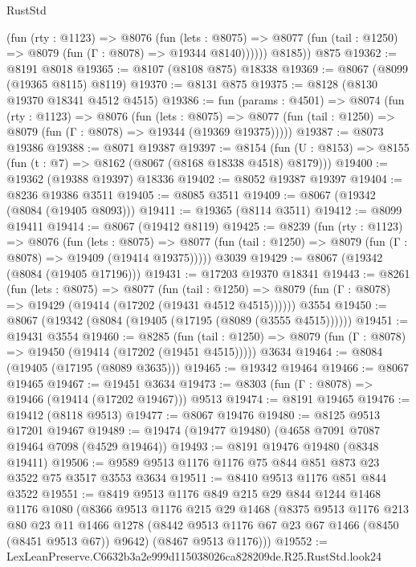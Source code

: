 \begin{lexlean}{RustStd}
\begin{coremodule}
            (fun (rty : @1123) =>
            @8076
              (fun (lets : @8075) =>
              @8077 (fun (tail : @1250) => @8079 (fun (Γ : @8078) => @19344 @8140))))))
        @8185))
    @875
@19362 := @8191 @8018
@19365 := @8107 (@8108 @875) @18338
@19369 := @8067 (@8099 (@19365 @8115) @8119)
@19370 := @8131 @875
@19375 := @8128 (@8130 @19370 @18341 @4512 @4515)
@19386 := fun (params : @4501) =>
  @8074
    (fun (rty : @1123) =>
    @8076
      (fun (lets : @8075) =>
      @8077 (fun (tail : @1250) => @8079 (fun (Γ : @8078) => @19344 (@19369 @19375)))))
@19387 := @8073 @19386
@19388 := @8071 @19387
@19397 := @8154
    (fun (U : @8153) => @8155 (fun (t : @7) => @8162 (@8067 (@8168 @18338 @4518) @8179)))
@19400 := @19362 (@19388 @19397) @18336
@19402 := @8052 @19387 @19397
@19404 := @8236 @19386 @3511
@19405 := @8085 @3511
@19409 := @8067 (@19342 (@8084 (@19405 @8093)))
@19411 := @19365 (@8114 @3511)
@19412 := @8099 @19411
@19414 := @8067 (@19412 @8119)
@19425 := @8239
    (fun (rty : @1123) =>
    @8076
      (fun (lets : @8075) =>
      @8077 (fun (tail : @1250) => @8079 (fun (Γ : @8078) => @19409 (@19414 @19375)))))
    @3039
@19429 := @8067 (@19342 (@8084 (@19405 @17196)))
@19431 := @17203 @19370 @18341
@19443 := @8261
    (fun (lets : @8075) =>
    @8077
      (fun (tail : @1250) =>
      @8079 (fun (Γ : @8078) => @19429 (@19414 (@17202 (@19431 @4512 @4515))))))
    @3554
@19450 := @8067 (@19342 (@8084 (@19405 (@17195 (@8089 (@3555 @4515))))))
@19451 := @19431 @3554
@19460 := @8285
    (fun (tail : @1250) => @8079 (fun (Γ : @8078) => @19450 (@19414 (@17202 (@19451 @4515)))))
    @3634
@19464 := @8084 (@19405 (@17195 (@8089 @3635)))
@19465 := @19342 @19464
@19466 := @8067 @19465
@19467 := @19451 @3634
@19473 := @8303 (fun (Γ : @8078) => @19466 (@19414 (@17202 @19467))) @9513
@19474 := @8191 @19465
@19476 := @19412 (@8118 @9513)
@19477 := @8067 @19476
@19480 := @8125 @9513 @17201 @19467
@19489 := @19474 (@19477 @19480) (@4658 @7091 @7087 @19464 @7098 (@4529 @19464))
@19493 := @8191 @19476 @19480 (@8348 @19411)
@19506 := @9589 @9513 @1176 @1176 @75 @844 @851 @873 @23 @3522 @75 @3517 @3553 @3634
@19511 := @8410 @9513 @1176 @851 @844 @3522
@19551 := @8419
    @9513
    @1176
    @849
    @215
    @29
    @844
    @1244
    @1468
    @1176
    @1080
    (@8366
      @9513
      @1176
      @215
      @29
      @1468
      (@8375
        @9513
        @1176
        @213
        @80
        @23
        @11
        @1466
        @1278
        (@8442 @9513 @1176 @67 @23 @67 @1466 (@8450 (@8451 @9513 @67)) @9642)
        (@8467 @9513 @1176)))
@19552 := LexLeanPreserve.C6632b3a2e999d115038026ca828209de.R25.RustStd.look24

\end{coremodule}
\end{lexlean}
